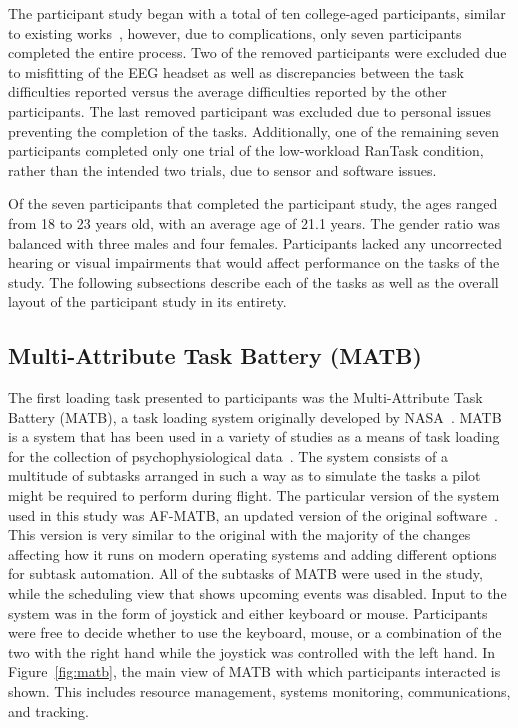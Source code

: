 \documentclass[11pt]{article}
\begin{document}
The participant study began with a total of ten college-aged participants, similar to existing works~\cite{Ting,Wang_R,Wilson_2010, Yin, Zhang}, however, due to complications, only seven participants completed the entire process. 
Two of the removed participants were excluded due to misfitting of the EEG headset as well as discrepancies between the task difficulties reported versus the average difficulties reported by the other participants. The last removed participant was excluded due to personal issues preventing the completion of the tasks. Additionally, one of the remaining seven participants completed only one trial of the low-workload RanTask condition, rather than the intended two trials, due to sensor and software issues.

Of the seven participants that completed the participant study, the ages ranged from 18 to 23 years old, with an average age of 21.1 years. The gender ratio was balanced with three males and four females. Participants lacked any uncorrected hearing or visual impairments that would affect performance on the tasks of the study. 
The following subsections describe each of the tasks as well as the overall layout of the participant study in its entirety.
	
	\subsection{Multi-Attribute Task Battery (MATB)}
	The first loading task presented to participants was the Multi-Attribute Task Battery (MATB), a task loading system originally developed by NASA~\cite{Comstock}. MATB is a system that has been used in a variety of studies as a means of task loading for the collection of psychophysiological data~\cite{Wilson, Smith, Wang_Z}. The system consists of a multitude of subtasks arranged in such a way as to simulate the tasks a pilot might be required to perform during flight. The particular version of the system used in this study was AF-MATB, an updated version of the original software~\cite{Estepp}. This version is very similar to the original with the majority of the changes affecting how it runs on modern operating systems and adding different options for subtask automation. All of the subtasks of MATB were used in the study, while the scheduling view that shows upcoming events was disabled. Input to the system was in the form of joystick and either keyboard or mouse. Participants were free to decide whether to use the keyboard, mouse, or a combination of the two with the right hand while the joystick was controlled with the left hand. In Figure~\ref{fig:matb}, the main view of MATB with which participants interacted is shown. This includes resource management, systems monitoring, communications, and tracking. 
	
\end{document}
